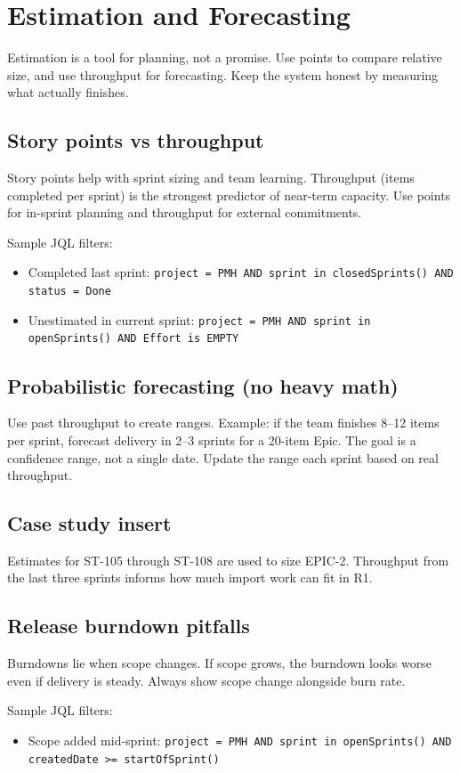 \section{Estimation and Forecasting}
Estimation is a tool for planning, not a promise. Use points to compare relative size, and use throughput for forecasting. Keep the system honest by measuring what actually finishes.

\subsection{Story points vs throughput}
Story points help with sprint sizing and team learning. Throughput (items completed per sprint) is the strongest predictor of near-term capacity. Use points for in-sprint planning and throughput for external commitments.

Sample JQL filters:
\begin{itemize}
  \item Completed last sprint: \texttt{project = PMH AND sprint in closedSprints() AND status = Done}
  \item Unestimated in current sprint: \texttt{project = PMH AND sprint in openSprints() AND Effort is EMPTY}
\end{itemize}

\subsection{Probabilistic forecasting (no heavy math)}
Use past throughput to create ranges. Example: if the team finishes 8--12 items per sprint, forecast delivery in 2--3 sprints for a 20-item Epic. The goal is a confidence range, not a single date. Update the range each sprint based on real throughput.

\subsection{Case study insert}
Estimates for ST-105 through ST-108 are used to size EPIC-2. Throughput from the last three sprints informs how much import work can fit in R1.
\subsection{Release burndown pitfalls}
Burndowns lie when scope changes. If scope grows, the burndown looks worse even if delivery is steady. Always show scope change alongside burn rate.

Sample JQL filters:
\begin{itemize}
  \item Scope added mid-sprint: \texttt{project = PMH AND sprint in openSprints() AND createdDate >= startOfSprint()}
\end{itemize}









